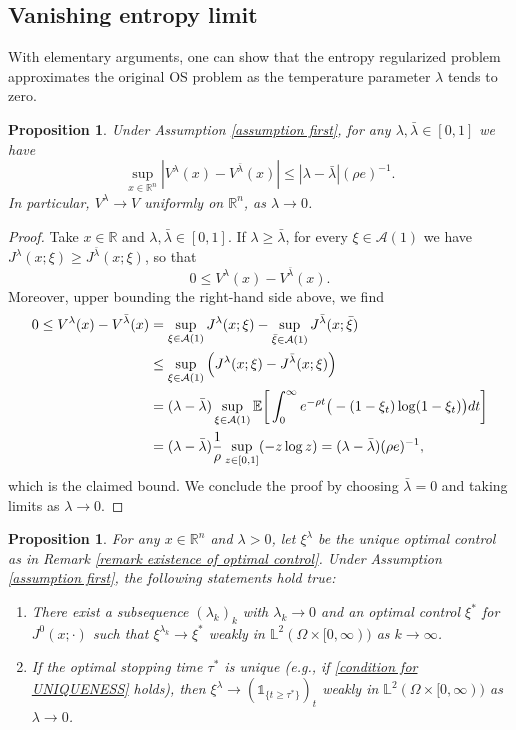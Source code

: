 \documentclass[11pt]{amsart}
\newtheorem{proposition}[theorem]{Proposition}
\theoremstyle{plain}
\def \dd{{\rm d}}
\def \R{\mathbb{R}}
\numberwithin{equation}{section}
\begin{document}
\subsection{Vanishing entropy limit}
With elementary arguments, one can show that the entropy regularized problem approximates the original OS problem as the temperature parameter $\lambda$ tends to zero.
\begin{proposition}\label{proposition vanishing entropy Value}
Under Assumption \ref{assumption first}, for any $\lambda , \bar \lambda \in [0,1]$ we have 
$$
\sup _{ x \in \R ^n } | V^\lambda ( x) - V^{\bar \lambda } (x)| \leq   
 | \lambda - \bar \lambda| (\rho e)^{-1}.
 $$
In particular, $V^\lambda  \to V $ uniformly on $ \mathbb R ^n$,  as $\lambda \to 0$.    
\end{proposition}

\begin{proof}
Take $x \in \mathbb R$ and  $\lambda , \bar \lambda \in [0,1]$.
If $\lambda \geq \bar \lambda$, for every $\xi \in \mathcal A (1)$ we have  $J ^\lambda (x;\xi) \geq J ^{\bar \lambda } (x;\xi)$, so that
$$
0 \leq V^\lambda ( x) - V^{\bar \lambda } (x).
$$
Moreover, upper bounding the right-hand side above, we find
$$
\begin{aligned}
0 \leq V^\lambda ( x) - V^{\bar \lambda } (x)  
& = \sup _{\xi \in \mathcal A (1)} J ^\lambda (x;\xi) - \sup _{\bar \xi \in \mathcal A (1)} J ^{\bar \lambda } (x; \bar \xi) \\
& \leq \sup _{\xi \in \mathcal A (1)} \Big( J ^\lambda (x;\xi) -  J ^{\bar \lambda } (x;  \xi) \Big) \\
 & = (  \lambda - \bar \lambda)   \sup _{\xi \in \mathcal A (1)} \mathbb E  \bigg[\int_0^\infty e ^{-\rho t}     \big( - (1-\xi_t) \log (1-\xi_t) \big)  \dd t \bigg] \\
 & = ( \lambda - \bar \lambda) \frac1{\rho} \sup_{z \in [0,1]} (-z \log z) =  ( \lambda - \bar \lambda) (\rho e)^{-1},
\end{aligned}
$$
which is the claimed bound. 
We conclude the proof by choosing $\bar \lambda  = 0$ and taking limits as $\lambda \to 0$.
\end{proof}

\begin{proposition}\label{proposition vanishing entropy Control}
For any $x \in \R^n$ and $\lambda >0$, let  $\xi^\lambda$ be the unique optimal control as in Remark \ref{remark existence of optimal control}.
Under Assumption \ref{assumption first}, the following statements hold true:
\begin{enumerate}
    \item There exist a subsequence $(\lambda_k)_k$ with $\lambda_k \to0$ and an optimal control $\xi^*$ for $J^0 (x;\cdot)$ such that
$\xi^{\lambda_k} \to \xi^*$ weakly in $\mathbb L ^2 (\Omega \times [0,\infty) )$ as $k \to \infty$.
    \item If the optimal stopping time $\tau^*$ is unique (e.g., if \eqref{condition for UNIQUENESS} holds), then $ \xi ^\lambda  \to   (\mathds 1 _{ \{ t \geq \tau^* \} })_t $ weakly in $\mathbb L ^2 (\Omega \times [0,\infty) )$ as $\lambda \to 0$.     
\end{enumerate}
\end{proposition}
\end{document}

